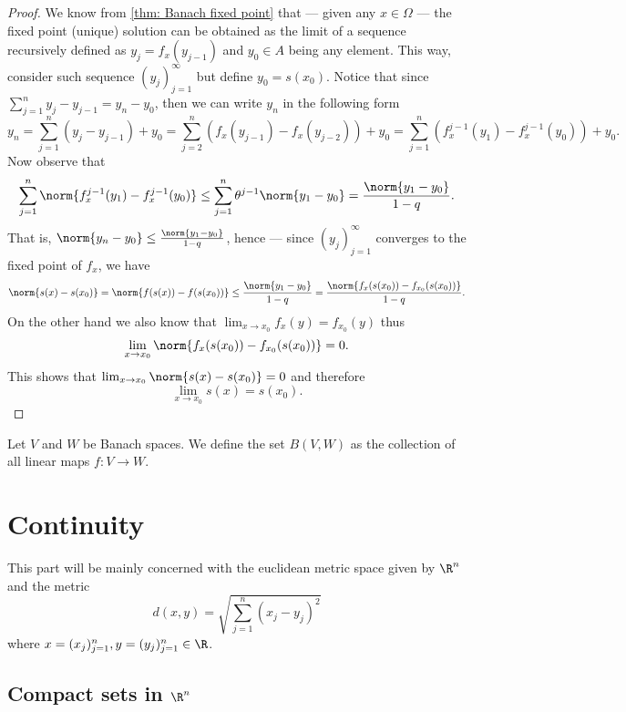 \begin{proof}
We know from \cref{thm: Banach fixed point} that --- given any \(x \in \Omega\) ---
the fixed point (unique) solution can be obtained as the limit of
a sequence recursively defined as \(y_j = f_x(y_{j-1})\) and \(y_0 \in A\) being
any element. This way, consider such sequence \((y_j)_{j=1}^{\infty}\) but define
\(y_0 = s(x_0)\). Notice that since \(\sum_{j=1}^n y_j - y_{j-1} = y_n - y_0\),
then we can write \(y_n\) in the following form
\[
y_n = \sum_{j=1}^n (y_j - y_{j-1}) + y_0
= \sum_{j=2}^n (f_x(y_{j-1}) - f_x(y_{j-2}))
+ y_0 = \sum_{j=1}^n \left(f_x^{j-1}(y_1) - f_x^{j-1}(y_0)\right) + y_{0}.
\]
Now observe that
\[
\sum_{j=1}^n \norm{f_x^{j-1}(y_1) - f_x^{j-1}(y_0)}
\leq \sum_{j=1}^n \theta^{j-1} \norm{y_1 -
y_0} = \frac{\norm{y_1 - y_0}}{1 - q}.
\]
That is, \(\norm{y_n - y_0} \leq \frac{\norm{y_1 - y_0}}{1 - q}\), hence --- since
\((y_j)_{j=1}^{\infty}\) converges to the fixed point of \(f_x\), we have
\begin{align*}
\norm{s(x) - s(x_0)} = \norm{f(s(x)) - f(s(x_0))}
\leq \frac{\norm{y_1 - y_0}}{1-q}
= \frac{\norm{f_x(s(x_0)) - f_{x_0}(s(x_0))}}{1 - q}.
\end{align*}
On the other hand we also know that \(\lim_{x \to x_0}f_x(y) = f_{x_0}(y)\) thus
\[
\lim_{x \to x_0} \norm{f_x(s(x_0)) - f_{x_0}(s(x_0))} = 0.
\]
This shows that \(\lim_{x \to x_0} \norm{s(x) - s(x_0)} = 0\) and therefore
\[
\lim_{x \to x_0} s(x) = s(x_0).
\]
\end{proof}

\begin{definition}
\label{def:banach-space-hom-set}
Let \(V\) and \(W\) be Banach spaces. We define the set \(B(V, W)\) as the
collection of all linear maps \(f: V \to W\).
\end{definition}

\section{Continuity}

\begin{remark}
This part will be mainly concerned with the euclidean metric space given by
\(\R^n\) and the metric
\[
d(x, y) = \sqrt{\sum_{j=1}^n (x_j - y_j)^2}
\]
where \(x = (x_j)_{j=1}^n, y = (y_j)_{j=1}^n \in \R\).
\end{remark}

\subsection{Compact sets in \texorpdfstring{\(\R^n\)}{Rn}}


